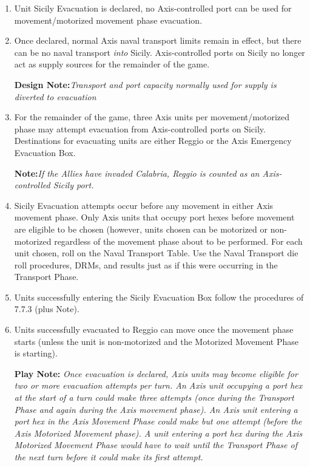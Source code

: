 \begin{enumerate}[label=\alph*.]
    \item Unit Sicily Evacuation is declared, no Axis-controlled port can be used for movement/motorized movement phase evacuation.
    \item Once declared, normal Axis naval transport limits remain in effect, but there can be no naval transport \textit{into} Sicily. Axis-controlled ports on Sicily no longer act as supply sources for the remainder of the game.
    
    \textbf{Design Note:}\textit{Transport and port capacity normally used for supply is diverted to evacuation}
    
    \item For the remainder of the game, three Axis units per movement/motorized phase may attempt evacuation from Axis-controlled ports on Sicily. Destinations for evacuating units are either Reggio or the Axis Emergency Evacuation Box.
    
    \textbf{Note:}\textit{If the Allies have invaded Calabria, Reggio is counted as an Axis-controlled Sicily port.}
    
    \item Sicily Evacuation attempts occur before any movement in either Axis movement phase. Only Axis units that occupy port hexes before movement are eligible to be chosen (however, units chosen can be motorized or non-motorized regardless of the movement phase about to be performed. For each unit chosen, roll on the Naval Transport Table. Use the Naval Transport die roll procedures, DRMs, and results just as if this were occurring in the Transport Phase.
    
    \item Units successfully entering the Sicily Evacuation Box follow the procedures of 7.7.3 (plus Note).
    
    \item Units successfully evacuated to Reggio can move once the movement phase starts (unless the unit is non-motorized and the Motorized Movement Phase is starting).
    
    \textbf{Play Note:} \textit{Once evacuation is declared, Axis units may become eligible for two or more evacuation attempts per turn. An Axis unit occupying a port hex at the start of a turn could make three attempts (once during the Transport Phase and again during the Axis movement phase). An Axis unit entering a port hex in the Axis Movement Phase could make but one attempt (before the Axis Motorized Movement phase). A unit entering a port hex during the Axis Motorized Movement Phase would have to wait until the Transport Phase of the next turn before it could make its first attempt.}
\end{enumerate}
